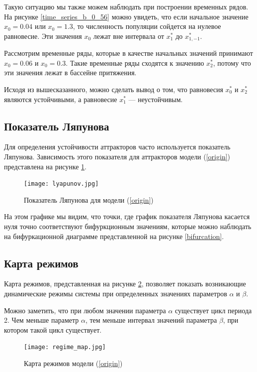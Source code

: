         Такую ситуацию мы также можем наблюдать при построении временных рядов. На рисунке \ref{time_series_b_0_56} можно увидеть, что если начальное значение \(x_0 = 0.04\) или \(x_0 = 1.3\), то численность популяции сойдется на нулевое равновесие. Эти значения \(x_0\) лежат вне интервала от \(x_1^*\) до \(x_{1, -1}^*\).

        Рассмотрим временные ряды, которые в качестве начальных значений принимают \(x_0 = 0.06\) и \(x_0 = 0.3\). Такие временные ряды сходятся к значению \(x_2^*\), потому что эти значения лежат в бассейне притяжения.

        Исходя из вышесказанного, можно сделать вывод о том, что равновесия \(x_0^*\) и \(x_2^*\) являются устойчивыми, а равновесие \(x_1^*\) --- неустойчивым.

    \subsection{Показатель Ляпунова}    

        Для определения устойчивости аттракторов часто используется показатель Ляпунова. Зависимость этого показателя для аттракторов модели (\ref{origin}) представлена на рисунке \ref{lyapunov}. 

        \begin{figure}
            \centering
            \texttt{[image: lyapunov.jpg]}

            \captionsetup{justification=centering}
            \caption{Показатель Ляпунова для модели (\ref{origin})}
            \label{lyapunov}
        \end{figure}

        На этом графике мы видим, что точки, где график показателя Ляпунова касается нуля точно соответствуют бифуркционным значениям, которые можно наблюдать на бифуркационной диаграмме представленной на рисунке \ref{bifurcation}.

    \subsection{Карта режимов}

        Карта режимов, представленная на рисунке \ref{regimeMap}, позволяет показать возникающие динамические режимы системы при определенных значениях параметров \(\alpha\) и \(\beta\).

        Можно заметить, что при любом значении параметра \(\alpha\) существует цикл периода  2. Чем меньше параметр \(\alpha\), тем меньше интервал значений параметра \(\beta\), при котором такой цикл существует.

        \begin{figure}
            \centering
            \texttt{[image: regime\_map.jpg]}

            \captionsetup{justification=centering}
            \caption{Карта режимов модели (\ref{origin})}
            \label{regimeMap}
        \end{figure}